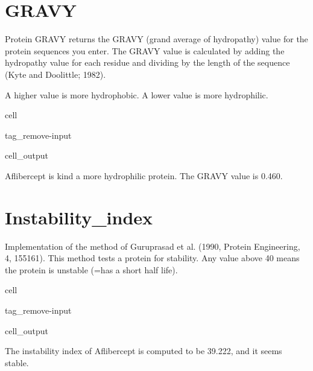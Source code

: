 \documentclass[letterpaper,10pt,english]{jupyterBook}
\begin{document}
\section{GRAVY}
\label{\detokenize{ipynb/chapter1:gravy}}
\sphinxAtStartPar
Protein GRAVY returns the GRAVY (grand average of hydropathy) value for the protein sequences you enter. The GRAVY value is calculated by adding the hydropathy value for each residue and dividing by the length of the sequence (Kyte and Doolittle; 1982).

\sphinxAtStartPar
A higher value is more hydrophobic. A lower value is more hydrophilic.

\begin{sphinxuseclass}{cell}
\begin{sphinxuseclass}{tag_remove-input}\begin{sphinxVerbatimOutput}

\begin{sphinxuseclass}{cell_output}
\begin{sphinxVerbatim}[commandchars=\\\{\}]
Aflibercept is kind a more hydrophilic protein. The GRAVY value is \PYGZhy{}0.460.
\end{sphinxVerbatim}

\end{sphinxuseclass}\end{sphinxVerbatimOutput}

\end{sphinxuseclass}
\end{sphinxuseclass}

\section{Instability\_index}
\label{\detokenize{ipynb/chapter1:instability-index}}
\sphinxAtStartPar
Implementation of the method of Guruprasad et al. (1990, Protein Engineering, 4, 155\sphinxhyphen{}161). This method tests a protein for stability. Any value above 40 means the protein is unstable (=has a short half life).

\begin{sphinxuseclass}{cell}
\begin{sphinxuseclass}{tag_remove-input}\begin{sphinxVerbatimOutput}

\begin{sphinxuseclass}{cell_output}
\begin{sphinxVerbatim}[commandchars=\\\{\}]
The instability index of Aflibercept is computed to be 39.222, and it seems stable.
\end{sphinxVerbatim}

\end{sphinxuseclass}\end{sphinxVerbatimOutput}

\end{sphinxuseclass}
\end{sphinxuseclass}
\sphinxstepscope
\end{document}
